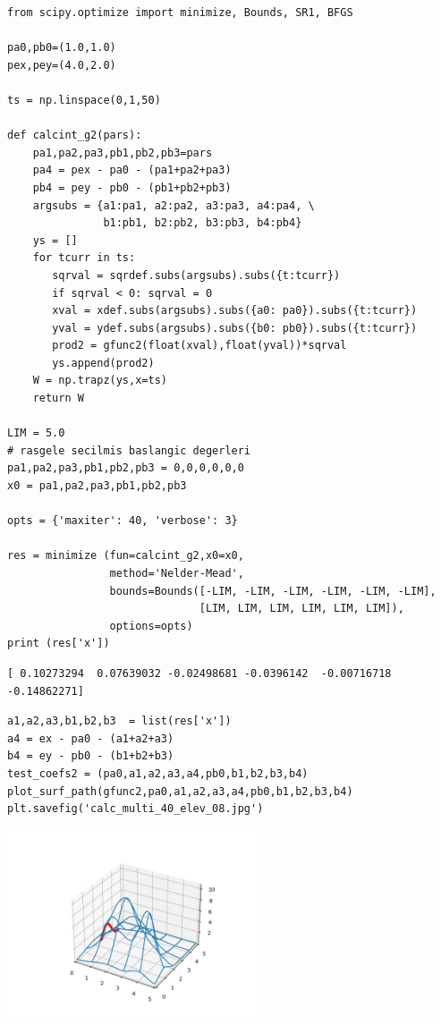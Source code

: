 \documentclass[12pt,fleqn]{article}\usepackage{../../common}
\begin{document}
\begin{verbatim}
from scipy.optimize import minimize, Bounds, SR1, BFGS

pa0,pb0=(1.0,1.0)
pex,pey=(4.0,2.0)

ts = np.linspace(0,1,50)

def calcint_g2(pars):
    pa1,pa2,pa3,pb1,pb2,pb3=pars
    pa4 = pex - pa0 - (pa1+pa2+pa3)
    pb4 = pey - pb0 - (pb1+pb2+pb3)
    argsubs = {a1:pa1, a2:pa2, a3:pa3, a4:pa4, \
               b1:pb1, b2:pb2, b3:pb3, b4:pb4}
    ys = []
    for tcurr in ts:
       sqrval = sqrdef.subs(argsubs).subs({t:tcurr})
       if sqrval < 0: sqrval = 0    
       xval = xdef.subs(argsubs).subs({a0: pa0}).subs({t:tcurr})
       yval = ydef.subs(argsubs).subs({b0: pb0}).subs({t:tcurr})
       prod2 = gfunc2(float(xval),float(yval))*sqrval
       ys.append(prod2)
    W = np.trapz(ys,x=ts)
    return W
    
LIM = 5.0
# rasgele secilmis baslangic degerleri
pa1,pa2,pa3,pb1,pb2,pb3 = 0,0,0,0,0,0
x0 = pa1,pa2,pa3,pb1,pb2,pb3

opts = {'maxiter': 40, 'verbose': 3}

res = minimize (fun=calcint_g2,x0=x0,
                method='Nelder-Mead',
                bounds=Bounds([-LIM, -LIM, -LIM, -LIM, -LIM, -LIM],
                              [LIM, LIM, LIM, LIM, LIM, LIM]),
                options=opts)
print (res['x'])
\end{verbatim}

\begin{verbatim}
[ 0.10273294  0.07639032 -0.02498681 -0.0396142  -0.00716718 -0.14862271]
\end{verbatim}

\begin{verbatim}
a1,a2,a3,b1,b2,b3  = list(res['x'])
a4 = ex - pa0 - (a1+a2+a3)
b4 = ey - pb0 - (b1+b2+b3)
test_coefs2 = (pa0,a1,a2,a3,a4,pb0,b1,b2,b3,b4)
plot_surf_path(gfunc2,pa0,a1,a2,a3,a4,pb0,b1,b2,b3,b4)
plt.savefig('calc_multi_40_elev_08.jpg')
\end{verbatim}

\includegraphics[width=20em]{calc_multi_40_elev_08.jpg}
\end{document}

